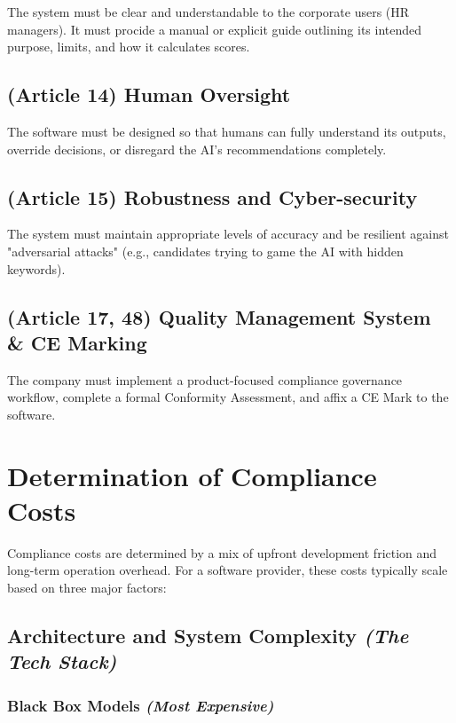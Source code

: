 \documentclass[a4paper, 12pt]{article}
\begin{document}
The system must be clear and understandable to the corporate users (HR managers). It must procide a manual or explicit guide outlining its intended purpose, limits, and how it calculates scores.

\subsection{(Article 14) Human Oversight}

The software must be designed so that humans can fully understand its outputs, override decisions, or disregard the AI's recommendations completely.

\subsection{(Article 15) Robustness and Cyber-security}

The system must maintain appropriate levels of accuracy and be resilient against "adversarial attacks" (e.g., candidates trying to game the AI with hidden keywords).

\subsection{(Article 17, 48) Quality Management System \& CE Marking}

The company must implement a product-focused compliance governance workflow, complete a formal Conformity Assessment, and affix a CE Mark to the software.

\newpage
\section{Determination of Compliance Costs}

Compliance costs are determined by a mix of upfront development friction and long-term operation overhead. For a software provider, these costs typically scale based on three major factors:

\subsection{Architecture and System Complexity \textit{(The Tech Stack)}}

\subsubsection{Black Box Models \textit{(Most Expensive)}}
\end{document}
